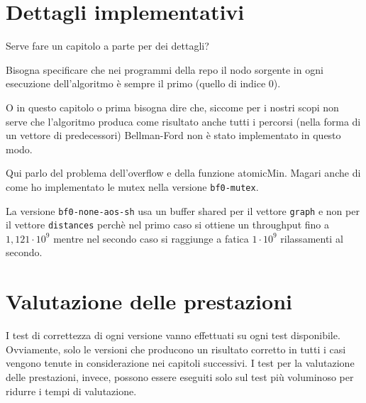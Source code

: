 \documentclass[a4paper]{article}
\begin{document}
	\section{Dettagli implementativi}
	\label{section:impl}
	Serve fare un capitolo a parte per dei dettagli?
	
	Bisogna specificare che nei programmi della repo il nodo sorgente in ogni esecuzione dell'algoritmo è sempre il primo (quello di indice 0).
	
	O in questo capitolo o prima bisogna dire che, siccome per i nostri scopi non serve che l'algoritmo produca come risultato anche tutti i percorsi (nella forma di un vettore di predecessori) Bellman-Ford non è stato implementato in questo modo.
	
	Qui parlo del problema dell'overflow e della funzione atomicMin. Magari anche di come ho implementato le mutex nella versione \texttt{bf0-mutex}.
	
	La versione \texttt{bf0-none-aos-sh} usa un buffer shared per il vettore \texttt{graph} e non per il vettore \texttt{distances} perchè nel primo caso si ottiene un throughput fino a $1,121\cdot 10^9$ mentre nel secondo caso si raggiunge a fatica $1\cdot 10^9$ rilassamenti al secondo.
	
	\section{Valutazione delle prestazioni}
	\label{section:perf}
	I test di correttezza di ogni versione vanno effettuati su ogni test disponibile. Ovviamente, solo le versioni che producono un risultato corretto in tutti i casi vengono tenute in considerazione nei capitoli successivi. I test per la valutazione delle prestazioni, invece, possono essere eseguiti solo sul test più voluminoso per ridurre i tempi di valutazione.
	
\end{document}
